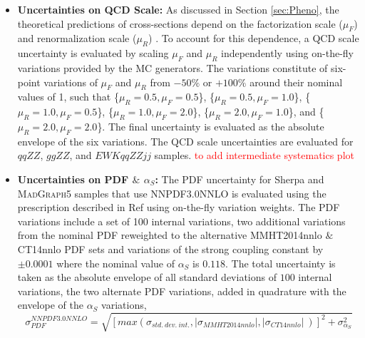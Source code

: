 \begin{itemize}
\item{\textbf{Uncertainties on QCD Scale:} As discussed in Section \ref{sec:Pheno}, the theoretical predictions of cross-sections depend on the factorization scale ($\mu_{F}$) and renormalization scale ($\mu_{R}$) \cite{QCDScaleAndPDFUnc}. To account for this dependence, a QCD scale uncertainty is evaluated by scaling $\mu_{F}$ and $\mu_{R}$ independently using on-the-fly variations provided by the MC generators. The variations constitute of six-point variations of $\mu_{F}$ and $\mu_{R}$ from $-50\%$ or $+100\%$ around their nominal values of 1, such that \{$\mu_R = 0.5, \mu_F = 0.5$\}, \{$\mu_R = 0.5, \mu_F = 1.0$\}, \{$\mu_R = 1.0, \mu_F = 0.5$\}, \{$\mu_R = 1.0, \mu_F = 2.0$\}, \{$\mu_R = 2.0, \mu_F = 1.0$\}, and \{$\mu_R = 2.0, \mu_F = 2.0$\}. The final uncertainty is evaluated as the absolute envelope of the six variations. The QCD scale uncertainties are evaluated for $qqZZ$, $ggZZ$, and $EWK qqZZjj$ samples. \textcolor{red}{to add intermediate systematics plot} %

}
\item{\textbf{Uncertainties on PDF $\&$ $\alpha_{S}$:}
The PDF uncertainty for Sherpa and \textsc{MadGraph5} samples that use NNPDF3.0NNLO is evaluated using the prescription described in Ref \cite{PDFForRunII} using on-the-fly variation weights. The PDF variations include a set of 100 internal variations, two additional variations from the nominal PDF reweighted to the alternative MMHT2014nnlo \cite{MMHT2014PDFs} $\&$ CT14nnlo \cite{CT14nnlo} PDF sets and variations of the strong coupling constant by $\pm0.0001$ where the nominal value of $\alpha_{S}$ is $0.118$. The total uncertainty is taken as the absolute envelope of all standard deviations of $100$ internal variations, the two alternate PDF variations, added in quadrature with the envelope of the $\alpha_{S}$ variations, 
\begin{equation}
    \sigma_{PDF}^{NNPDF3.0NNLO} = \sqrt{ [ max (\sigma_{std.~dev.~int.}, |\sigma_{MMHT2014nnlo}| , |\sigma_{CT14nnlo}|~)]^2 + \sigma_{\alpha_S}^2 }
\end{equation}

}
\end{itemize}
